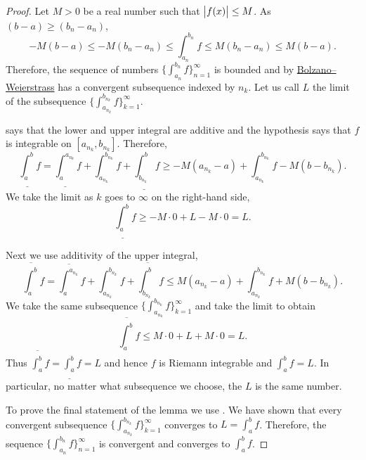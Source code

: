 \begin{proof}
Let $M > 0$ be a real number such that $\bigl\lvert {f(x)} \bigr\rvert \leq M$.
As $(b-a) \geq (b_n-a_n)$,
\begin{equation*}
-M(b-a) \leq
-M(b_n-a_n) \leq
\int_{a_n}^{b_n} f
\leq
M(b_n-a_n) \leq
M(b-a) .
\end{equation*}
Therefore, the sequence of numbers
$\bigl\{ \int_{a_n}^{b_n} f \bigr\}_{n=1}^\infty$ is bounded and by
\hyperref[thm:bwseq]{Bolzano--Weierstrass}
has a convergent subsequence indexed by $n_k$.  Let us call
$L$ the limit of the subsequence
$\bigl\{ \int_{a_{n_k}}^{b_{n_k}} f \bigr\}_{k=1}^\infty$.

 says that
the lower and upper integral are additive
and the hypothesis says that
$f$ is integrable on $[a_{n_k},b_{n_k}]$.
Therefore,
\begin{equation*}
\underline{\int_a^b} f
=
\underline{\int_a^{a_{n_k}}} f
+
\int_{a_{n_k}}^{b_{n_k}} f
+
\underline{\int_{b_{n_k}}^b} f
\geq
-M(a_{n_k}-a)
+
\int_{a_{n_k}}^{b_{n_k}} f
-
M(b-b_{n_k}) .
\end{equation*}
We take the limit as $k$ goes to $\infty$ on the right-hand side,
\begin{equation*}
\underline{\int_a^b} f
\geq
-M\cdot 0
+
L
-
M\cdot 0
= L .
\end{equation*}

Next we use additivity of the upper integral,
\begin{equation*}
\overline{\int_a^b} f
=
\overline{\int_a^{a_{n_k}}} f
+
\int_{a_{n_k}}^{b_{n_k}} f
+
\overline{\int_{b_{n_k}}^b} f
\leq
M(a_{n_k}-a)
+
\int_{a_{n_k}}^{b_{n_k}} f
+
M(b-b_{n_k}) .
\end{equation*}
We take the same subsequence 
$\{ \int_{a_{n_k}}^{b_{n_k}} f \}_{k=1}^\infty$ and take the limit 
to obtain
\begin{equation*}
\overline{\int_a^b} f
\leq
M\cdot 0
+
L
+
M\cdot 0
= L .
\end{equation*}
Thus $\overline{\int_a^b} f = \underline{\int_a^b} f = L$
and hence $f$ is Riemann integrable and $\int_a^b f = L$.
In particular, no matter what
subsequence we choose,
the $L$ is the same number.

To prove the final statement of the lemma we use 
.  We have shown that every convergent
subsequence
$\bigl\{ \int_{a_{n_k}}^{b_{n_k}} f \bigr\}_{k=1}^\infty$ converges to $L = \int_a^b f$.
Therefore, the sequence
$\bigl\{ \int_{a_n}^{b_n} f \bigr\}_{n=1}^\infty$ is convergent and converges to $\int_a^b f$.
\end{proof}

